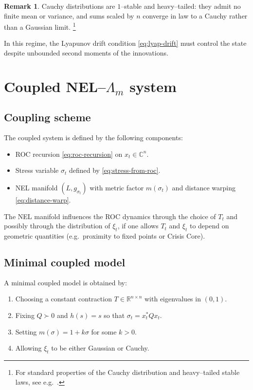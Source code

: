 \documentclass[11pt]{article}
\theoremstyle{plain}
\theoremstyle{definition}
\newtheorem{remark}[theorem]{Remark}
\numberwithin{equation}{section}
\begin{document}
\begin{remark}
Cauchy distributions are $1$--stable and heavy--tailed: they admit no
finite mean or variance, and sums scaled by $n$ converge in law to a
Cauchy rather than a Gaussian limit.%
\footnote{For standard properties of the Cauchy distribution and
heavy--tailed stable laws, see e.g.\ \cite{cauchy-notes,heavy-tails}.}
\end{remark}

In this regime, the Lyapunov drift condition
\eqref{eq:lyap-drift} must control the state despite unbounded second
moments of the innovations.

\section{Coupled NEL--$\Lambda_m$ system}

\subsection{Coupling scheme}

The coupled system is defined by the following components:

\begin{itemize}
  \item ROC recursion \eqref{eq:roc-recursion} on $x_t \in \mathbb{C}^n$.

  \item Stress variable $\sigma_t$ defined by
  \eqref{eq:stress-from-roc}.

  \item NEL manifold $(L,g_{\sigma_t})$ with metric factor
  $m(\sigma_t)$ and distance warping
  \eqref{eq:distance-warp}.
\end{itemize}

The NEL manifold influences the ROC dynamics through the choice of
$T_t$ and possibly through the distribution of $\xi_t$,
if one allows $T_t$ and $\xi_t$ to depend on geometric quantities
(e.g.\ proximity to fixed points or Crisis Core).

\subsection{Minimal coupled model}

A minimal coupled model is obtained by:
\begin{enumerate}[label=(\alph*)]
  \item Choosing a constant contraction $T \in \mathbb{R}^{n\times n}$
  with eigenvalues in $(0,1)$.

  \item Fixing $Q \succ 0$ and $h(s) = s$ so that
  $\sigma_t = x_t^\ast Q x_t$.

  \item Setting $m(\sigma) = 1 + k\sigma$ for some $k > 0$.

  \item Allowing $\xi_t$ to be either Gaussian or Cauchy.
\end{enumerate}
\end{document}
